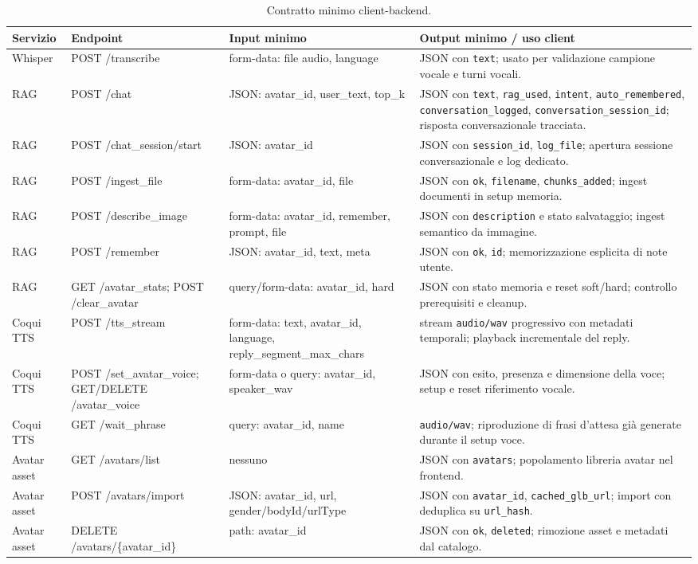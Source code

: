   \begin{table}[!b]
  \centering
  \scriptsize
  \renewcommand{\arraystretch}{1.18}
  \setlength{\tabcolsep}{5pt}
  \begin{tabularx}{\textwidth}{@{}p{}p{}p{}X@{}}
\toprule
Servizio & Endpoint & Input minimo & Output minimo / uso client \\
\midrule
Whisper & POST /transcribe & form-data: file audio, language & JSON con \texttt{text}; usato per validazione campione vocale e turni vocali. \\
RAG & POST /chat & JSON: avatar\_id, user\_text, top\_k & JSON con \texttt{text}, \texttt{rag\_used}, \texttt{intent}, \texttt{auto\_remembered}, \texttt{conversation\_logged}, \texttt{conversation\_session\_id}; risposta conversazionale tracciata. \\
RAG & POST /chat\_session/start & JSON: avatar\_id & JSON con \texttt{session\_id}, \texttt{log\_file}; apertura sessione conversazionale e log dedicato. \\
RAG & POST /ingest\_file & form-data: avatar\_id, file & JSON con \texttt{ok}, \texttt{filename}, \texttt{chunks\_added}; ingest documenti in setup memoria. \\
RAG & POST /describe\_image & form-data: avatar\_id, remember, prompt, file & JSON con \texttt{description} e stato salvataggio; ingest semantico da immagine. \\
RAG & POST /remember & JSON: avatar\_id, text, meta & JSON con \texttt{ok}, \texttt{id}; memorizzazione esplicita di note utente. \\
RAG & GET /avatar\_stats; POST /clear\_avatar & query/form-data: avatar\_id, hard & JSON con stato memoria e reset soft/hard; controllo prerequisiti e cleanup. \\
Coqui TTS & POST /tts\_stream & form-data: text, avatar\_id, language, reply\_segment\_max\_chars & stream \texttt{audio/wav} progressivo con metadati temporali; playback incrementale del reply. \\
Coqui TTS & POST /set\_avatar\_voice; GET/DELETE /avatar\_voice & form-data o query: avatar\_id, speaker\_wav & JSON con esito, presenza e dimensione della voce; setup e reset riferimento vocale. \\
Coqui TTS & GET /wait\_phrase & query: avatar\_id, name & \texttt{audio/wav}; riproduzione di frasi d'attesa già generate durante il setup voce. \\
Avatar asset & GET /avatars/list & nessuno & JSON con \texttt{avatars}; popolamento libreria avatar nel frontend. \\
Avatar asset & POST /avatars/import & JSON: avatar\_id, url, gender/bodyId/urlType & JSON con \texttt{avatar\_id}, \texttt{cached\_glb\_url}; import con deduplica su \texttt{url\_hash}. \\
Avatar asset & DELETE /avatars/\{avatar\_id\} & path: avatar\_id & JSON con \texttt{ok}, \texttt{deleted}; rimozione asset e metadati dal catalogo. \\
\bottomrule
\end{tabularx}
\caption[Contratto minimo client-backend]{Contratto minimo client-backend.}
\label{tab:backend-client-endpoints}
\end{table}
